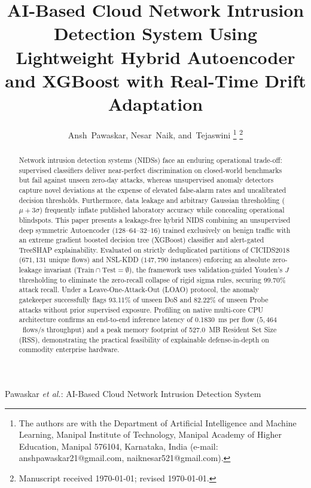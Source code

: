 \documentclass[journal]{IEEEtran}
\begin{document}
\title{AI-Based Cloud Network Intrusion Detection System Using Lightweight Hybrid Autoencoder and XGBoost with Real-Time Drift Adaptation}

\author{Ansh~Pawaskar,
        Nesar~Naik,
        and~Tejaswini%
\thanks{The authors are with the Department of Artificial Intelligence and Machine Learning, Manipal Institute of Technology, Manipal Academy of Higher Education, Manipal 576104, Karnataka, India (e-mail: anshpawaskar21@gmail.com, naiknesar521@gmail.com).}%
\thanks{Manuscript received \today; revised \today.}%
}

%
{Pawaskar \MakeLowercase{\textit{et al.}}: AI-Based Cloud Network Intrusion Detection System}

\maketitle

\begin{abstract}
Network intrusion detection systems (NIDSs) face an enduring operational trade-off: supervised classifiers deliver near-perfect discrimination on closed-world benchmarks but fail against unseen zero-day attacks, whereas unsupervised anomaly detectors capture novel deviations at the expense of elevated false-alarm rates and uncalibrated decision thresholds. Furthermore, data leakage and arbitrary Gaussian thresholding ($\mu + 3\sigma$) frequently inflate published laboratory accuracy while concealing operational blindspots. This paper presents a leakage-free hybrid NIDS combining an unsupervised deep symmetric Autoencoder ($128\text{--}64\text{--}32\text{--}16$) trained exclusively on benign traffic with an extreme gradient boosted decision tree (XGBoost) classifier and alert-gated TreeSHAP explainability. Evaluated on strictly deduplicated partitions of CICIDS2018 ($671{,}131$ unique flows) and NSL-KDD ($147{,}790$ instances) enforcing an absolute zero-leakage invariant ($\text{Train} \cap \text{Test} = \emptyset$), the framework uses validation-guided Youden's $J$ thresholding to eliminate the zero-recall collapse of rigid sigma rules, securing 99.70\% attack recall. Under a Leave-One-Attack-Out (LOAO) protocol, the anomaly gatekeeper successfully flags 93.11\% of unseen DoS and 82.22\% of unseen Probe attacks without prior supervised exposure. Profiling on native multi-core CPU architecture confirms an end-to-end inference latency of 0.1830~ms per flow ($5{,}464$~flows/s throughput) and a peak memory footprint of 527.0~MB Resident Set Size (RSS), demonstrating the practical feasibility of explainable defense-in-depth on commodity enterprise hardware.
\end{abstract}
\end{document}
